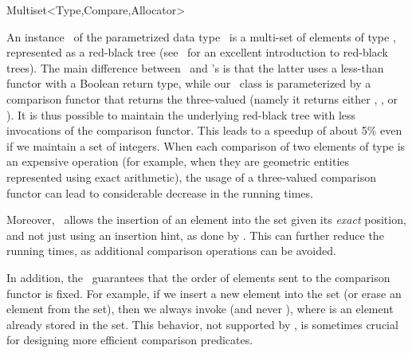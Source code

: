 

\begin{ccRefClass}{Multiset<Type,Compare,Allocator>}
\label{class:cgal_multimap}

\ccDefinition

An instance \ccVar\ of the parametrized data type \ccRefName\ is a
multi-set of elements of type , represented as a red-black tree
(see~\cite[Chapter~13]{clrs-ia-01} for an excellent introduction to red-black
trees).
The main difference between \ccRefName\ and \stl's  is that
the latter uses a less-than functor with a Boolean return type, while our
\ccRefName\ class is parameterized by a comparison functor  that
returns the three-valued  (namely it returns either
, , or ). It is thus possible to maintain
the underlying red-black tree with less invocations of the comparison functor.
This leads to a speedup of about 5\% even if we maintain a set of integers.
When each comparison of two elements of type  is an expensive
operation (for example, when they are geometric entities represented using
exact arithmetic), the usage of a three-valued comparison functor can lead to
considerable decrease in the running times.

Moreover, \ccRefName\ allows the insertion of an element into the set given
its {\em exact} position, and not just using an insertion hint, as done by 
. This can further reduce the running times, as additional
comparison operations can be avoided.

In addition, the \ccRefName\ guarantees that the order of elements sent to the
comparison functor is fixed. For example, if we insert a new element 
into the set (or erase an element from the set), then we always invoke 
 (and never ), where  is an
element already stored in the set. This behavior, not supported by
, is sometimes crucial for designing more efficient
comparison predicates.


\end{ccRefClass}
